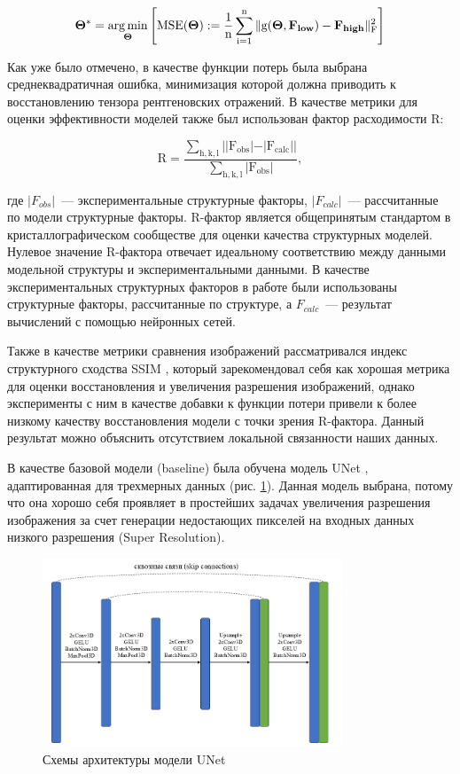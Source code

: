 \begin{equation}
\mathrm{\mathbf{\Theta^*} = \operatorname*{arg\,min}_{\mathbf{\Theta}} \left[ MSE(\mathbf{\Theta}) := \frac{1}{n}\sum\limits_{i=1}^n\|g(\mathbf{\Theta}, \mathbf{F_{low}}) - \mathbf{F_{high}}\|^2_F\right]}
\end{equation} 


Как уже было отмечено, в качестве функции потерь была выбрана среднеквадратичная ошибка, минимизация которой должна приводить к восстановлению тензора рентгеновских отражений. В качестве метрики для оценки эффективности моделей также был использован фактор расходимости R:

\begin{equation}
\mathrm{R = \frac{\sum\limits_{h,k,l}||F_{obs}|-|F_{calc}||}{\sum\limits_{h,k,l}|F_{obs}|}},
\end{equation}

где $|F_{obs}|$~--- экспериментальные структурные факторы, $|F_{calc}|$~--- рассчитанные по модели структурные факторы. R-фактор является общепринятым стандартом в кристаллографическом сообществе для оценки качества структурных моделей. Нулевое значение R-фактора отвечает идеальному соответствию между данными модельной структуры и экспериментальными данными. В качестве экспериментальных структурных факторов в работе были использованы структурные факторы, рассчитанные по структуре, а $F_{calc}$~--- результат вычислений с помощью нейронных сетей.

Также в качестве метрики сравнения изображений рассматривался индекс структурного сходства SSIM \cite{zeng_3d-ssim_2012}, который зарекомендовал себя как хорошая метрика для оценки восстановления и увеличения разрешения изображений, однако эксперименты с ним в качестве добавки к функции потери привели к более низкому качеству восстановления модели с точки зрения R-фактора. Данный результат можно объяснить отсутствием локальной связанности наших данных.

В качестве базовой модели (baseline) была обучена модель UNet \cite{ronneberger_u-net_2015}, адаптированная для трехмерных данных (рис. \ref{unet}). Данная модель выбрана, потому что она хорошо себя проявляет в простейших задачах увеличения разрешения изображения за счет генерации недостающих пикселей на входных данных низкого разрешения (Super Resolution).

\begin{figure}[H]
    \centering
    \includegraphics[width=0.8\textwidth]{figures/unet_arch.png}
    \caption{Схемы архитектуры модели UNet}
    \label{unet}
\end{figure}

